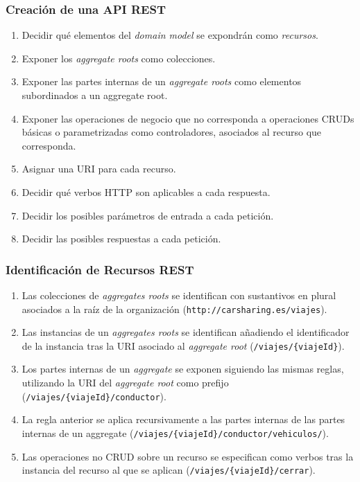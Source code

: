 \documentclass[a4paper,slidestop,xcolor=pst,blue]{beamer}
\begin{document}
\begin{frame}[c]
    \frametitle{Creación de una API REST}
    \begin{enumerate}[<+->]
        \item Decidir qué elementos del \emph{domain model} se expondrán como \emph{recursos}.
        \item Exponer los \emph{aggregate roots} como colecciones.
        \item Exponer las partes internas de un \emph{aggregate roots} como elementos subordinados a un aggregate root.
        \item Exponer las operaciones de negocio que no corresponda a operaciones CRUDs básicas o parametrizadas como controladores, asociados al recurso que corresponda.
        \item Asignar una URI para cada recurso.
        \item Decidir qué verbos HTTP son aplicables a cada respuesta.
        \item Decidir los posibles parámetros de entrada a cada petición.
        \item Decidir las posibles respuestas a cada petición.
    \end{enumerate}
\end{frame}

\begin{frame}[c]
    \frametitle{Identificación de Recursos REST}
    \begin{enumerate}[<+->]
        \item Las colecciones de \emph{aggregates roots} se identifican con sustantivos en plural asociados a la raíz de la organización (\texttt{http://carsharing.es/viajes}).
        \item Las instancias de un \emph{aggregates roots} se identifican añadiendo el identificador de la instancia tras la URI asociado al \emph{aggregate root}
            (\texttt{/viajes/\{viajeId\}}).
        \item Los partes internas de un \emph{aggregate} se exponen siguiendo las mismas reglas, utilizando la URI del \emph{aggregate root} como prefijo (\texttt{/viajes/\{viajeId\}/conductor}).
        \item La regla anterior se aplica recursivamente a las partes internas de las partes internas de un aggregate (\texttt{/viajes/\{viajeId\}/conductor/vehiculos/}).
        \item Las operaciones no CRUD sobre un recurso se especifican como verbos tras la instancia del recurso al que se aplican (\texttt{/viajes/\{viajeId\}/cerrar}).
    \end{enumerate}
\end{frame}
\end{document}
